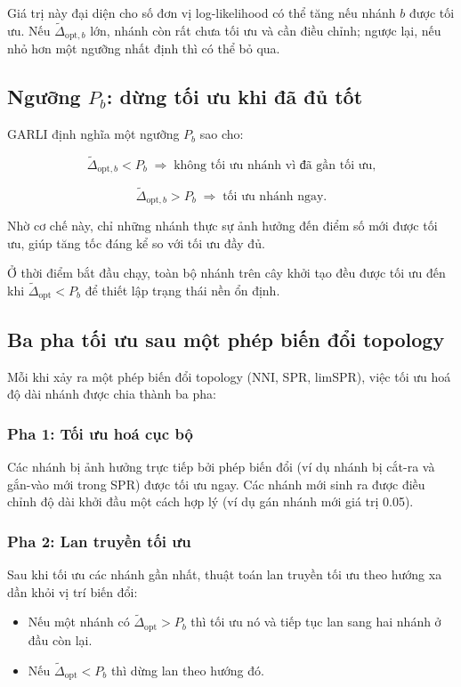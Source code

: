 \documentclass[12pt,a4paper]{report}
\begin{document}
Giá trị này đại diện cho số đơn vị log-likelihood có thể tăng nếu nhánh $b$ được tối ưu. 
Nếu $\tilde{\Delta}_{\mathrm{opt},b}$ lớn, nhánh còn rất chưa tối ưu và cần điều chỉnh; 
ngược lại, nếu nhỏ hơn một ngưỡng nhất định thì có thể bỏ qua.

\subsection{Ngưỡng \texorpdfstring{$P_b$}{Pb}: dừng tối ưu khi đã đủ tốt}

GARLI định nghĩa một ngưỡng $P_b$ sao cho:

\[
\tilde{\Delta}_{\mathrm{opt},b} < P_b \;\Rightarrow\; 
\text{không tối ưu nhánh vì đã gần tối ưu,}
\]

\[
\tilde{\Delta}_{\mathrm{opt},b} > P_b \;\Rightarrow\;
\text{tối ưu nhánh ngay}.
\]

Nhờ cơ chế này, chỉ những nhánh thực sự ảnh hưởng đến điểm số mới được tối ưu, giúp 
tăng tốc đáng kể so với tối ưu đầy đủ.

Ở thời điểm bắt đầu chạy, toàn bộ nhánh trên cây khởi tạo đều được tối ưu đến khi
$\tilde{\Delta}_{\mathrm{opt}} < P_b$ để thiết lập trạng thái nền ổn định.

\subsection{Ba pha tối ưu sau một phép biến đổi topology}

Mỗi khi xảy ra một phép biến đổi topology (NNI, SPR, limSPR), việc tối ưu hoá độ dài 
nhánh được chia thành ba pha:

\subsubsection{Pha 1: Tối ưu hoá cục bộ}

Các nhánh bị ảnh hưởng trực tiếp bởi phép biến đổi (ví dụ nhánh bị cắt-ra và gắn-vào mới 
trong SPR) được tối ưu ngay. Các nhánh mới sinh ra được điều chỉnh độ dài khởi đầu 
một cách hợp lý (ví dụ gán nhánh mới giá trị 0.05).

\subsubsection{Pha 2: Lan truyền tối ưu}

Sau khi tối ưu các nhánh gần nhất, thuật toán lan truyền tối ưu theo hướng xa dần khỏi
vị trí biến đổi:

\begin{itemize}
  \item Nếu một nhánh có $\tilde{\Delta}_{\mathrm{opt}} > P_b$ thì tối ưu nó và 
        tiếp tục lan sang hai nhánh ở đầu còn lại.
  \item Nếu $\tilde{\Delta}_{\mathrm{opt}} < P_b$ thì dừng lan theo hướng đó.
\end{itemize}
\end{document}
